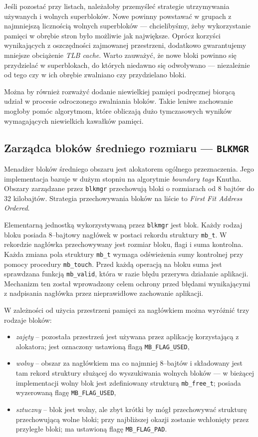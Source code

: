 \documentclass[12pt,a4paper,titlepage,twoside]{mwart}
\begin{document}
Jeśli pozostać przy listach, należałoby przemyśleć strategie utrzymywania
używanych i wolnych superbloków. Nowe powinny powstawać w grupach z najmniejszą
licznością wolnych superbloków --- chcielibyśmy, żeby wykorzystanie pamięci w
obrębie stron było możliwie jak największe. Oprócz korzyści wynikających z
oszczędności zajmowanej przestrzeni, dodatkowo gwarantujemy mniejsze obciążenie
\textit{TLB cache}. Warto zauważyć, że nowe bloki powinno się przydzielać w
superblokach, do których niedawno się odwoływano --- niezależnie od tego czy
w ich obrębie zwalniano czy przydzielano bloki.

Można by również rozważyć dodanie niewielkiej pamięci podręcznej biorącą udział
w procesie odroczonego zwalniania bloków. Takie leniwe zachowanie mogłoby pomóc
algorytmom, które obliczają dużo tymczasowych wyników wymagających niewielkich
kawałków pamięci.

\subsection{Zarządca bloków średniego rozmiaru --- \texttt{BLKMGR}}

Menadżer bloków średniego obszaru jest alokatorem ogólnego przeznaczenia. Jego
implementacja bazuje w dużym stopniu na algorytmie \textit{boundary tags}
Knutha. Obszary zarządzane przez \texttt{blkmgr} przechowują bloki o
rozmiarach od 8 bajtów do 32 kilobajtów. Strategia przechowywania bloków na
liście to \textit{First Fit Address Ordered}.

Elementarną jednostką wykorzystywaną przez \texttt{blkmgr} jest blok. Każdy
rodzaj bloku posiada $8$--bajtowy nagłówek w postaci rekordu struktury
\texttt{mb\_t}. W rekordzie nagłówka przechowywany jest rozmiar bloku, flagi i
suma kontrolna. Każda zmiana pola struktury \verb+mb_t+ wymaga odświeżenia sumy
kontrolnej przy pomocy procedury \verb+mb_touch+. Przed każdą operacją na bloku
suma jest sprawdzana funkcją \verb+mb_valid+, która w razie błędu przerywa
działanie aplikacji. Mechanizm ten został wprowadzony celem ochrony przed
błędami wynikającymi z nadpisania nagłówka przez nieprawidłowe zachowanie
aplikacji.

W zależności od użycia przestrzeni pamięci za nagłówkiem można wyróżnić trzy
rodzaje bloków:
\begin{itemize}
\item \textit{zajęty} -- pozostała przestrzeń jest używana przez aplikację
korzystającą z alokatora; jest oznaczony ustawioną flagą \verb+MB_FLAG_USED+,
\item \textit{wolny} -- obszar za nagłówkiem ma co najmniej $8$--bajtów i
składowany jest tam rekord struktury służącej do wyszukiwania wolnych bloków
--- w bieżącej implementacji wolny blok jest zdefiniowany strukturą
\verb+mb_free_t+; posiada wyzerowaną flagę \verb+MB_FLAG_USED+,
\item \textit{sztuczny} -- blok jest wolny, ale zbyt krótki by mógł
przechowywać strukturę przechowującą wolne bloki; przy najbliższej okazji
zostanie wchłonięty przez przyległe bloki; ma ustawioną flagę
\verb+MB_FLAG_PAD+.
\end{itemize}
\end{document}
